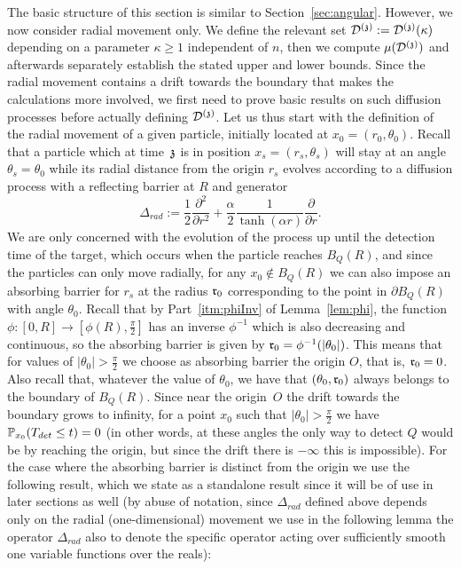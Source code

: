 The basic structure of this section is similar to Section~\ref{sec:angular}.
However, we now consider radial movement only. We define the relevant set $\dt:=\dt(\kappa)$ depending on a parameter $\kappa\geq 1$ independent of $n$, then we compute $\mu(\dt)$ and afterwards 
separately establish the stated upper and lower bounds. Since the radial movement contains a drift towards the boundary that makes the calculations more involved, we first need to prove basic results on such diffusion processes before actually defining $\dt$.
Let us thus start with the definition of the radial movement of a given particle, initially located at $x_0=(r_0, \theta_0)$. Recall that
a particle which at time~$\ss$ is in position
$x_s=(r_s,\theta_s)$ will stay at an angle $\theta_s=\theta_0$ while its
radial distance from the origin $r_s$ evolves according to a diffusion
process with a reflecting barrier at $R$ and generator 
\[
\Delta_{rad} := \frac{1}{2}\frac{\partial^2}{\partial r^2}+\frac{\alpha}{2}\frac{1}{\tanh(\alpha r)}\frac{\partial}{\partial r}.
\]
We are only concerned with the evolution of the process up until the detection time of the target, which occurs when the particle reaches $B_Q(R)$, and since the particles can only move radially, for any $x_0\not\in B_Q(R)$ we can also impose an absorbing barrier for $r_{s}$ at the radius $\rabs_0$ corresponding to the point in $\partial B_Q(R)$ with angle $\theta_0$. Recall that by Part~\eqref{itm:phiInv} of Lemma~\ref{lem:phi}, the function 
$\phi:[0,R]\to [\phi(R),\frac{\pi}{2}]$ has an inverse $\phi^{-1}$ 
which is also decreasing and continuous, so the absorbing barrier is given by $\rabs_0=\phi^{-1}(|\theta_0|)$.
This means that for values of $|\theta_0|>\frac{\pi}{2}$ we choose as absorbing barrier 
the origin $O$, that is,  $\rabs_0=0$.
Also recall that, whatever the value of $\theta_0$, we 
have that $(\theta_0,\rabs_0)$ always belongs to the boundary of $B_Q(R)$.
Since near the origin~$O$ the drift towards the boundary grows to infinity, for a point 
$x_0$ such that $|\theta_0|>\frac{\pi}{2}$ we have $\P_{x_0}(T_{det}\leq t)=0$ (in other words, at these angles the only way to detect $Q$ would be by reaching the origin, but since the drift there is $-\infty$ this is impossible). For the case where the absorbing barrier is distinct from the origin  we use the following result, which we state as a standalone result since it will be of use in later sections as well (by abuse of notation, since $\Delta_{rad}$ defined above depends only on the radial (one-dimensional) movement we use in the following lemma the operator $\Delta_{rad}$ also to denote the specific operator acting over sufficiently smooth one variable functions over the reals):%
